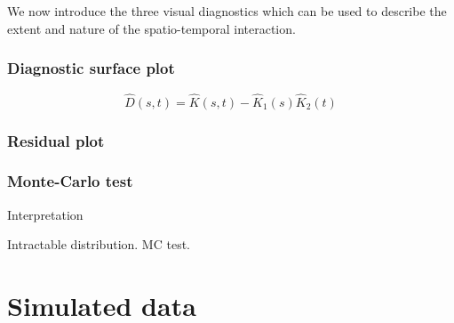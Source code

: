 \documentclass{article}
\begin{document}
We now introduce the three visual diagnostics which can be used to describe the extent and nature of the spatio-temporal interaction.

\subsubsection{Diagnostic surface plot}


$$\hat D(s,t) = \hat K(s,t) - \hat K_1(s) \hat K_2(t)$$

\subsubsection{Residual plot}



\subsubsection{Monte-Carlo test}





Interpretation


Intractable distribution. MC test.



\section{Simulated data}
\end{document}
